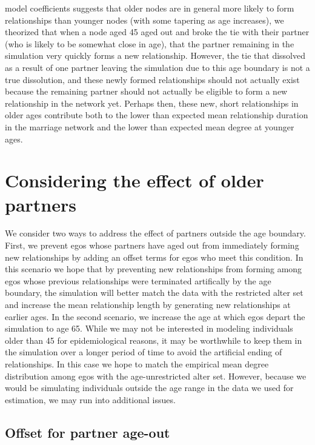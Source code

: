 \documentclass [11pt, proquest] {uwthesis}[2015/03/03]
\begin{document}
model coefficients suggests that older nodes are in general more likely
to form relationships than younger nodes (with some tapering as age
increases), we theorized that when a node aged 45 aged out and broke the
tie with their partner (who is likely to be somewhat close in age), that
the partner remaining in the simulation very quickly forms a new
relationship. However, the tie that dissolved as a result of one partner
leaving the simulation due to this age boundary is not a true
dissolution, and these newly formed relationships should not actually
exist because the remaining partner should not actually be eligible to
form a new relationship in the network yet. Perhaps then, these new,
short relationships in older ages contribute both to the lower than
expected mean relationship duration in the marriage network and the
lower than expected mean degree at younger ages.

\section{Considering the effect of older
partners}\label{considering-the-effect-of-older-partners}

We consider two ways to address the effect of partners outside the age
boundary. First, we prevent egos whose partners have aged out from
immediately forming new relationships by adding an offset terms for egos
who meet this condition. In this scenario we hope that by preventing new
relationships from forming among egos whose previous relationships were
terminated artifically by the age boundary, the simulation will better
match the data with the restricted alter set and increase the mean
relationship length by generating new relationships at earlier ages. In
the second scenario, we increase the age at which egos depart the
simulation to age 65. While we may not be interested in modeling
individuals older than 45 for epidemiological reasons, it may be
worthwhile to keep them in the simulation over a longer period of time
to avoid the artificial ending of relationships. In this case we hope to
match the empirical mean degree distribution among egos with the
age-unrestricted alter set. However, because we would be simulating
individuals outside the age range in the data we used for estimation, we
may run into additional issues.

\subsection{Offset for partner
age-out}\label{offset-for-partner-age-out}
\end{document}
